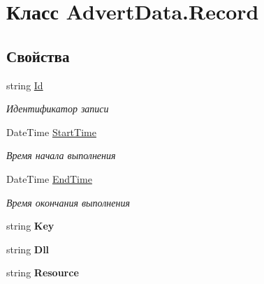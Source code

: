\hypertarget{class_advert_data_1_1_record}{\section{Класс Advert\+Data.\+Record}
\label{class_advert_data_1_1_record}
}
\subsection*{Свойства}
\begin{DoxyCompactItemize}
\item 
string \hyperlink{class_advert_data_1_1_record_a07f38726ac87b12bc78813719ab011cc}{Id}
\begin{DoxyCompactList}\small\item\em Идентификатор записи \end{DoxyCompactList}\item 
Date\+Time \hyperlink{class_advert_data_1_1_record_aae8675dc3bd9625fda7af9e03e1b95ee}{Start\+Time}
\begin{DoxyCompactList}\small\item\em Время начала выполнения \end{DoxyCompactList}\item 
Date\+Time \hyperlink{class_advert_data_1_1_record_ac343c5c1188872cd97e8394bd55e5631}{End\+Time}
\begin{DoxyCompactList}\small\item\em Время окончания выполнения \end{DoxyCompactList}\item 
\hypertarget{class_advert_data_1_1_record_a8ee61e05687eb3f0f57adbd8c8c0f55d}{string {\bfseries Key}}\label{class_advert_data_1_1_record_a8ee61e05687eb3f0f57adbd8c8c0f55d}

\item 
\hypertarget{class_advert_data_1_1_record_a46d4d0860781a7f2ccd9af26025d12b3}{string {\bfseries Dll}}\label{class_advert_data_1_1_record_a46d4d0860781a7f2ccd9af26025d12b3}

\item 
\hypertarget{class_advert_data_1_1_record_a4b980e3063827cac3498a6c38feb7720}{string {\bfseries Resource}}\label{class_advert_data_1_1_record_a4b980e3063827cac3498a6c38feb7720}


\end{DoxyCompactItemize}
